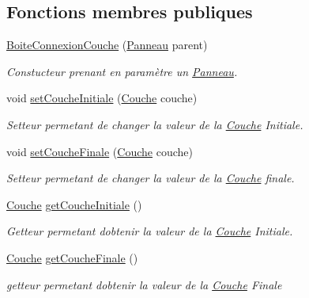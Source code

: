 \subsection*{Fonctions membres publiques}
\begin{DoxyCompactItemize}
\item 
\hyperlink{classBoiteConnexionCouche_a69b773ea326589e81c3beba4f8eef4e7}{Boite\+Connexion\+Couche} (\hyperlink{classPanneau}{Panneau} parent)
\begin{DoxyCompactList}\small\item\em Constucteur prenant en paramètre un \hyperlink{classPanneau}{Panneau}. \end{DoxyCompactList}\item 
void \hyperlink{classBoiteConnexionCouche_aca89aac7d4ae0ba89828c6d542790925}{set\+Couche\+Initiale} (\hyperlink{classCouche}{Couche} couche)
\begin{DoxyCompactList}\small\item\em Setteur permetant de changer la valeur de la \hyperlink{classCouche}{Couche} Initiale. \end{DoxyCompactList}\item 
void \hyperlink{classBoiteConnexionCouche_a9469138a3db603eddacf8757595ad6cf}{set\+Couche\+Finale} (\hyperlink{classCouche}{Couche} couche)
\begin{DoxyCompactList}\small\item\em Setteur permetant de changer la valeur de la \hyperlink{classCouche}{Couche} finale. \end{DoxyCompactList}\item 
\hyperlink{classCouche}{Couche} \hyperlink{classBoiteConnexionCouche_a3b0faf67baf198a1abaafc7c469fc6d2}{get\+Couche\+Initiale} ()
\begin{DoxyCompactList}\small\item\em Getteur permetant d\textquotesingle{}obtenir la valeur de la \hyperlink{classCouche}{Couche} Initiale. \end{DoxyCompactList}\item 
\hyperlink{classCouche}{Couche} \hyperlink{classBoiteConnexionCouche_af35c756dfc1f9491e2803b251f2d4434}{get\+Couche\+Finale} ()
\begin{DoxyCompactList}\small\item\em getteur permetant d\textquotesingle{}obtenir la valeur de la \hyperlink{classCouche}{Couche} Finale \end{DoxyCompactList}\end{DoxyCompactItemize}


